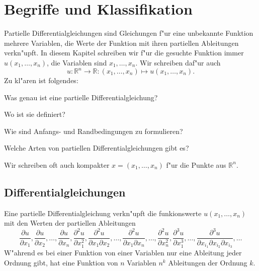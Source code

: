 %
% 
%
%
\chapter{Begriffe und Klassifikation}
Partielle Differentialgleichungen sind Gleichungen f"ur eine
unbekannte Funktion mehrere Variablen, die Werte der Funktion
mit ihren partiellen Ableitungen verkn"upft.
In diesem Kapitel schreiben wir f"ur die gesuchte Funktion immer
$u(x_1,\dots,x_n)$, die Variablen sind $x_1,\dots,x_n$.
Wir schreiben daf"ur auch
\[
u\colon \mathbb R^n\to\mathbb R:(x_1,\dots,x_n)\mapsto u(x_1,\dots,x_n).
\]
Zu kl"aren ist folgendes:
\begin{compactenum}
\item Was genau ist eine partielle Differentialgleichung?
\item Wo ist sie definiert?
\item Wie sind Anfangs- und Randbedingungen zu formulieren?
\item Welche Arten von partiellen Differentialgleichungen gibt es?
\end{compactenum}
Wir schreiben oft auch kompakter $x=(x_1,\dots,x_n)$ f"ur die Punkte
aus $\mathbb R^n$.

\section{Differentialgleichungen\label{klassifikation:differentialgleichungen}}
Eine partielle Differentialgleichung verkn"upft die funkionswerte
$u(x_1,\dots,x_n)$ mit den Werten der partiellen Ableitungen
\begin{equation}
\frac{\partial u}{\partial x_1},
\frac{\partial u}{\partial x_2},
\dots,
\frac{\partial u}{\partial x_n},
\frac{\partial^2 u}{\partial x_1^2},
\frac{\partial^2 u}{\partial x_1\partial x_2},\dots,
\frac{\partial^2 u}{\partial x_1\partial x_n},\dots,
\frac{\partial^2 u}{\partial x_n^2},
\frac{\partial^3 u}{\partial x_1^3},\dots,
\frac{\partial^3 u}{\partial x_{i_1}\partial x_{i_2}\partial x_{i_3}},\dots
\label{ableitungen}
\end{equation}
W"ahrend es bei einer Funktion von einer Variablen nur eine Ableitung
jeder Ordnung gibt, hat eine Funktion von $n$ Variablen $n^k$ Ableitungen
der Ordnung $k$.


